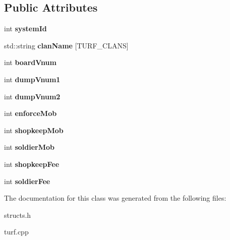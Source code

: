 \subsection*{Public Attributes}
\begin{DoxyCompactItemize}
\item 
\hypertarget{classTurfSystem_aa5746034cee0ced8cba900b27e0ec09a}{int {\bfseries system\-Id}}\label{classTurfSystem_aa5746034cee0ced8cba900b27e0ec09a}

\item 
\hypertarget{classTurfSystem_a2cef1b445a81d345ccae67689fe2f7ab}{std\-::string {\bfseries clan\-Name} \mbox{[}T\-U\-R\-F\-\_\-\-C\-L\-A\-N\-S\mbox{]}}\label{classTurfSystem_a2cef1b445a81d345ccae67689fe2f7ab}

\item 
\hypertarget{classTurfSystem_aa073cc7f204f5a1e60e495f3086eaa02}{int {\bfseries board\-Vnum}}\label{classTurfSystem_aa073cc7f204f5a1e60e495f3086eaa02}

\item 
\hypertarget{classTurfSystem_ab110656e923b1e05ceff952b9a53e006}{int {\bfseries dump\-Vnum1}}\label{classTurfSystem_ab110656e923b1e05ceff952b9a53e006}

\item 
\hypertarget{classTurfSystem_a6bdfdb3fc68c426054cc3f632249345c}{int {\bfseries dump\-Vnum2}}\label{classTurfSystem_a6bdfdb3fc68c426054cc3f632249345c}

\item 
\hypertarget{classTurfSystem_a3161f2d2bd6af42575f033a73681cb0e}{int {\bfseries enforce\-Mob}}\label{classTurfSystem_a3161f2d2bd6af42575f033a73681cb0e}

\item 
\hypertarget{classTurfSystem_abcafdb36f781eb1e8e67e8e3543a7e3e}{int {\bfseries shopkeep\-Mob}}\label{classTurfSystem_abcafdb36f781eb1e8e67e8e3543a7e3e}

\item 
\hypertarget{classTurfSystem_a033e759d856e32306f5331b5dd418c5c}{int {\bfseries soldier\-Mob}}\label{classTurfSystem_a033e759d856e32306f5331b5dd418c5c}

\item 
\hypertarget{classTurfSystem_a07d7f9ef716c90576e025f2aa723a34d}{int {\bfseries shopkeep\-Fee}}\label{classTurfSystem_a07d7f9ef716c90576e025f2aa723a34d}

\item 
\hypertarget{classTurfSystem_ab6ce40d3de05363ce523dea3e60e021d}{int {\bfseries soldier\-Fee}}\label{classTurfSystem_ab6ce40d3de05363ce523dea3e60e021d}

\end{DoxyCompactItemize}


The documentation for this class was generated from the following files\-:\begin{DoxyCompactItemize}
\item 
structs.\-h\item 
turf.\-cpp\end{DoxyCompactItemize}
